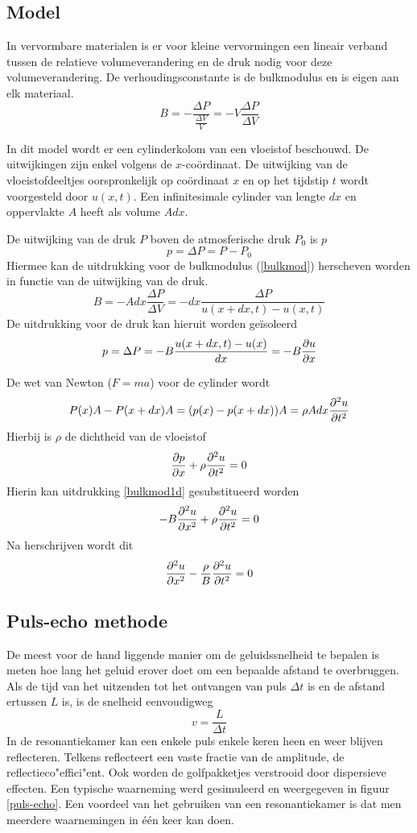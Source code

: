\subsection{Model}

In vervormbare materialen is er voor kleine vervormingen een lineair verband 
tussen de relatieve volumeverandering en de druk nodig voor deze 
volumeverandering. De verhoudingsconstante is de bulkmodulus en is eigen aan 
elk materiaal.
\begin{equation}
\label{bulkmod}
B = -\frac{\Delta P}{\frac{\Delta V}{V}} = - V \frac{\Delta P}{\Delta V}
\end{equation}


In dit model wordt er een cylinderkolom van een vloeistof beschouwd. De 
uitwijkingen zijn enkel volgens de $x$-co\"ordinaat. De uitwijking van de 
vloeistofdeeltjes oorspronkelijk op co\"ordinaat $x$ en op het tijdstip $t$ 
wordt voorgesteld door $u(x,t)$. Een infinitesimale cylinder van lengte $dx$ en 
oppervlakte $A$ heeft als volume $A dx$. 

De uitwijking van de druk $P$ boven de atmosferische druk $P_0$ is $p$
$$
p = \Delta P = P - P_0
$$
Hiermee kan de uitdrukking voor de bulkmodulus (\ref{bulkmod}) herscheven 
worden in functie van de uitwijking van de druk.
$$
B = -A dx \frac{\Delta P}{\Delta V} = -dx \frac{\Delta P}{ u(x+dx,t)-u(x,t)}
$$
De uitdrukking voor de druk kan hieruit worden ge\"isoleerd
\begin{equation}
\label{bulkmod1d}
p = \Delta P = -B \frac{u(x+dx,t)-u(x)}{dx} = -B \frac{\partial u}{\partial x}
\end{equation}

De wet van Newton ($F = ma$) voor de cylinder wordt
$$
P(x)A - P(x+dx)A = (p(x) - p(x+dx))A = \rho A dx \frac{\partial^2 u}{\partial t^2}
$$
Hierbij is $\rho$ de dichtheid van de vloeistof
$$
\frac{\partial p}{\partial x} + \rho \frac{\partial^2 u}{\partial t^2} = 0
$$
Hierin kan uitdrukking \ref{bulkmod1d} gesubstitueerd worden
$$
-B\frac{\partial^2 u}{\partial x^2} + \rho \frac{\partial^2 u}{\partial t^2} = 0
$$
Na herschrijven wordt dit
\begin{equation}
\label{waveeq}
\frac{\partial^2 u}{\partial x^2} - \frac{\rho}{B} \frac{\partial^2 u}{\partial t^2} = 0
\end{equation}

\subsection{Puls-echo methode}
De meest voor de hand liggende manier om de geluidssnelheid te bepalen is meten 
hoe lang het geluid erover doet om een bepaalde afstand te overbruggen. Als de 
tijd van het uitzenden tot het ontvangen van puls $\Delta t$ is en de afstand 
ertussen $L$ is, is de snelheid eenvoudigweg
$$
v = \frac{L}{\Delta t}
$$
In de resonantiekamer kan een enkele puls enkele keren heen en weer blijven 
reflecteren. Telkens reflecteert een vaste fractie van de amplitude, de 
reflectieco"effici"ent. Ook worden de golfpakketjes verstrooid door dispersieve 
effecten. Een typische waarneming werd gesimuleerd en weergegeven in figuur 
\ref{puls-echo}.  Een voordeel van het gebruiken van een resonantiekamer is dat
men meerdere waarnemingen in \'e\'en keer kan doen.

